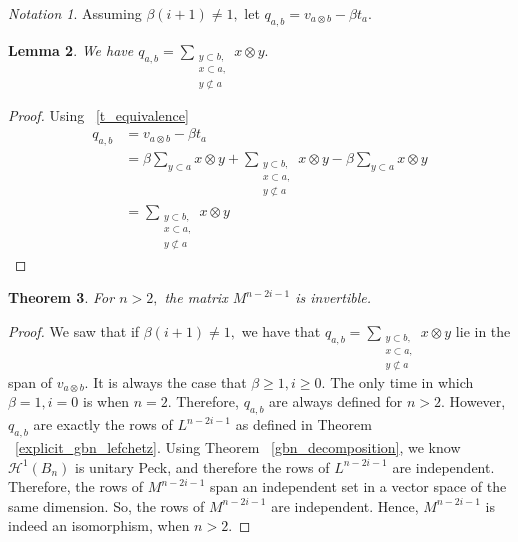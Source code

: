 \documentclass{amsart}
\newtheorem{thm}{Theorem}[subsection]
\newtheorem{lem}[thm]{Lemma}
\theoremstyle{remark}
\newtheorem{note}[thm]{Notation}
\newcommand\fbn{\mathcal H}
\begin{document}
\begin{note}
Assuming $\beta(i+1) \neq 1,$ let $q_{a,b} = v_{a\otimes b} - \beta t_a.$
\end{note}

\begin{lem}
We have $q_{a,b} = \sum_{\substack{{y\subset b,}\\{x \subset a,}\\{y\not\subset a}}}^{}x\otimes y.$
\end{lem}
\begin{proof}
Using ~\ref{t_equivalence}
\begin{align*}
	q_{a,b} &= v_{a\otimes b} - \beta t_a \\
	&= \beta \sum_{y \subset a}^{}x \otimes y + \sum_{\substack{{y\subset b,}\\{x \subset a,}\\{y\not\subset a}}}^{}x\otimes y - \beta\sum_{y\subset a}^{}x\otimes y\\
	&= \sum_{\substack{{y\subset b,}\\{x \subset a,}\\{y\not\subset a}}}^{}x\otimes y
\end{align*}
\end{proof}

\begin{thm}
For $n >2,$ the matrix $M^{n-2i-1}$ is invertible.
\end{thm}
\begin{proof}
We saw that if $\beta(i+1) \neq 1,$ we have that $q_{a,b} = \sum_{\substack{{y\subset b,}\\{x \subset a,}\\{y\not\subset a}}}^{}x\otimes y$ lie in the span of $v_{a\otimes b}.$ It is always the case that $\beta \geq 1,i \geq 0.$ The only time in which $\beta = 1,i=0$ is when $n = 2.$ Therefore, $q_{a,b}$ are always defined for $n > 2.$ However, $q_{a,b}$ are exactly the rows of $L^{n-2i-1}$ as defined in Theorem ~\ref{explicit_gbn_lefchetz}. Using Theorem ~\ref{gbn_decomposition}, we know $\fbn^1(B_n)$ is unitary Peck, and therefore the rows of $L^{n-2i-1}$ are independent. Therefore, the rows of $M^{n-2i-1}$ span an independent set in a vector space of the same dimension. So, the rows of $M^{n-2i-1}$ are independent. Hence, $M^{n-2i-1}$ is indeed an isomorphism, when $n > 2.$
\end{proof}




\end{document}
